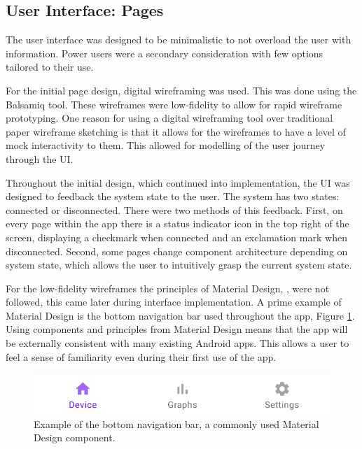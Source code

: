 \documentclass{l4proj}
\begin{document}
\subsection{User Interface: Pages}

The user interface was designed to be minimalistic to not overload the user with information. Power users were a secondary consideration with few options tailored to their use.

For the initial page design, digital wireframing was used. This was done using the Balsamiq \citep{balsamiq_balsamiq_2021} tool. These wireframes were low-fidelity to allow for rapid wireframe prototyping. One reason for using a digital wireframing tool over traditional paper wireframe sketching is that it allows for the wireframes to have a level of mock interactivity to them. This allowed for modelling of the user journey through the UI.

Throughout the initial design, which continued into implementation, the UI was designed to feedback the system state to the user. The system has two states: connected or disconnected. There were two methods of this feedback. First, on every page within the app there is a status indicator icon in the top right of the screen, displaying a checkmark when connected and an exclamation mark when disconnected. Second, some pages change component architecture depending on system state, which allows the user to intuitively grasp the current system state.

For the low-fidelity wireframes the principles of Material Design, \citep{google_design_nodate}, were not followed, this came later during interface implementation. A prime example of Material Design is the bottom navigation bar used throughout the app, Figure \ref{fig:bottom_nav}. Using components and principles from Material Design means that the app will be externally consistent with many existing Android apps. This allows a user to feel a sense of familiarity even during their first use of the app.

\begin{figure}[!htb]
    \centering
    \includegraphics[width=0.7\linewidth]{images/bottom_nav.png}

    \caption{ Example of the bottom navigation bar, a commonly used Material Design component.  }

    \label{fig:bottom_nav}
\end{figure}
\end{document}
